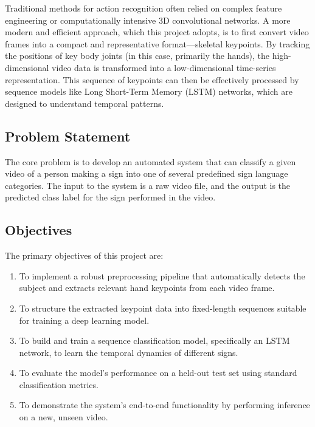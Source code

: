 \documentclass[11pt, a4paper]{article}
\begin{document}
Traditional methods for action recognition often relied on complex feature engineering or computationally intensive 3D convolutional networks. A more modern and efficient approach, which this project adopts, is to first convert video frames into a compact and representative format—skeletal keypoints. By tracking the positions of key body joints (in this case, primarily the hands), the high-dimensional video data is transformed into a low-dimensional time-series representation. This sequence of keypoints can then be effectively processed by sequence models like Long Short-Term Memory (LSTM) networks, which are designed to understand temporal patterns.

\subsection{Problem Statement}
The core problem is to develop an automated system that can classify a given video of a person making a sign into one of several predefined sign language categories. The input to the system is a raw video file, and the output is the predicted class label for the sign performed in the video.

\subsection{Objectives}
The primary objectives of this project are:
\begin{enumerate}
    \item To implement a robust preprocessing pipeline that automatically detects the subject and extracts relevant hand keypoints from each video frame.
    \item To structure the extracted keypoint data into fixed-length sequences suitable for training a deep learning model.
    \item To build and train a sequence classification model, specifically an LSTM network, to learn the temporal dynamics of different signs.
    \item To evaluate the model's performance on a held-out test set using standard classification metrics.
    \item To demonstrate the system's end-to-end functionality by performing inference on a new, unseen video.
\end{enumerate}
\end{document}

